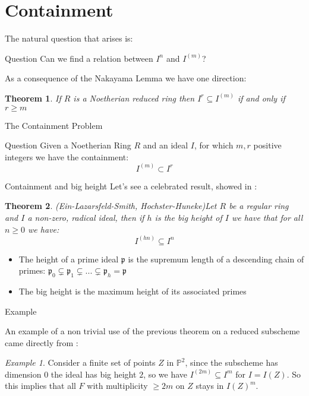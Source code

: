 \documentclass[dvipsnames]{beamer}
\theoremstyle{plain}
\newtheorem{teo}{Theorem}[section]
\theoremstyle{remark}
\newtheorem{ex}[rem]{Example}
\theoremstyle{definition}
\newcommand{\PP}{\mathbb{P}}
\newcommand{\p}{\mathfrak{p}}
\newcommand{\cont}[2]{ I^{(#1)} \subseteq I^{#2}}
\begin{document}
\section{Containment}

\begin{frame}
The natural question that arises is:
\begin{alertblock}{Question}
Can we find a relation between $ I^n $ and $ I^{(m)} $?
\end{alertblock}
\pause 
As a consequence of the Nakayama Lemma we have one direction:
\begin{teo}\label{teo:inv_cont}
	If $ R $ is a Noetherian reduced ring then $ I^r \subseteq I^{(m)}$  if and only if $ r \geq m $
\end{teo}
\end{frame}

\begin{frame}{The Containment Problem}
\begin{alertblock}{Question}
Given a Noetherian Ring $ R $ and an ideal $ I $, for which $ m,r $ positive integers we have the containment:
		$$ I^{(m)} \subset I^r $$
\end{alertblock}
\end{frame}

\begin{frame}{Containment and big height}
Let's see a celebrated result, showed in \cite{HocHun02,EinLazSmi01}:
	\begin{teo}{(Ein-Lazarsfeld-Smith, Hochster-Huneke)}\label{teo:cont:bigh}
	Let $ R $ be a regular ring and $ I $ a non-zero, radical ideal, then if $ h $ is the big height of $ I $ we have that for all $ n \geq 0 $ we have:
	\[ \cont{hn}{n}\]	
	\end{teo} 
\pause
\begin{itemize}
\item The height of a prime ideal $ \p $ is the supremum length of a descending chain of primes: $ \p_0 \subsetneq \p_1 \subsetneq ... \subsetneq \p_{h} = \p $
\item The big height is the maximum height of its associated primes
\end{itemize}
\end{frame}



\begin{frame}{Example}

An example of a non trivial use of the previous theorem on a reduced subscheme came directly from \cite[2.3]{EinLazSmi01}:
	
	\begin{ex}\label{es:P2points}
	Consider a finite set of points $ Z $ in $ \PP^2 $, since the subscheme has dimension $ 0 $ the ideal has big height $ 2 $, so we have $ \cont{2m}{m} $ for $ I = I(Z) $. So this implies that all $ F $ with multiplicity $ \geq 2m $ on $ Z $ stays in $ I(Z)^m $. 
	\end{ex}
	
\end{frame}
\end{document}
